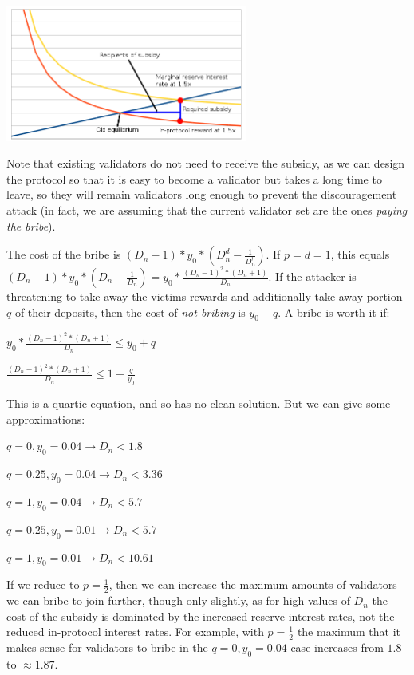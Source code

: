 \documentclass[12pt]{article}
\begin{document}
\includegraphics[width=300px]{disc_chart4.png}

Note that existing validators do not need to receive the subsidy, as we can design the protocol so that it is easy to become a validator but takes a long time to leave, so they will remain validators long enough to prevent the discouragement attack (in fact, we are assuming that the current validator set are the ones \textit{paying the bribe}).

The cost of the bribe is $(D_n - 1) * y_0 * (D_n^d - \frac{1}{D_n^p})$. If $p = d = 1$, this equals $(D_n - 1) * y_0 * (D_n - \frac{1}{D_n}) = y_0 * \frac{(D_n-1)^2 * (D_n+1)}{D_n}$. If the attacker is threatening to take away the victims rewards and additionally take away portion $q$ of their deposits, then the cost of \textit{not bribing} is $y_0 + q$. A bribe is worth it if:

$y_0 * \frac{(D_n-1)^2 * (D_n+1)}{D_n} \le y_0 + q$

$\frac{(D_n-1)^2 * (D_n+1)}{D_n} \le 1 + \frac{q}{y_0}$

This is a quartic equation, and so has no clean solution. But we can give some approximations:

$q = 0, y_0 = 0.04 \rightarrow D_n < 1.8$

$q = 0.25, y_0 = 0.04 \rightarrow D_n < 3.36$

$q = 1, y_0 = 0.04 \rightarrow D_n < 5.7$

$q = 0.25, y_0 = 0.01 \rightarrow D_n < 5.7$

$q = 1, y_0 = 0.01 \rightarrow D_n < 10.61$

If we reduce to $p = \frac{1}{2}$, then we can increase the maximum amounts of validators we can bribe to join further, though only slightly, as for high values of $D_n$ the cost of the subsidy is dominated by the increased reserve interest rates, not the reduced in-protocol interest rates. For example, with $p = \frac{1}{2}$ the maximum that it makes sense for validators to bribe in the $q = 0, y_0 = 0.04$ case increases from $1.8$ to $\approx 1.87$.
\end{document}
